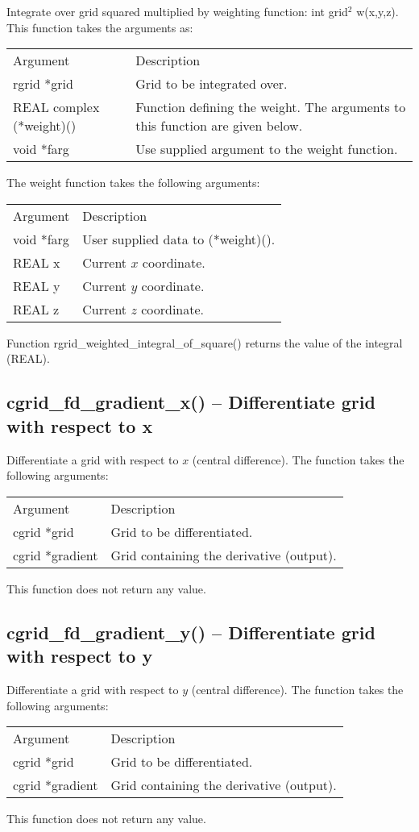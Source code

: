 \documentclass[12pt,letterpaper]{report}
\begin{document}
Integrate over grid squared multiplied by weighting function: int grid$^2$ w(x,y,z). This function takes the arguments as:
\begin{longtable}{p{} p{}}
Argument & Description\\
\cline{1-2}
rgrid *grid & Grid to be integrated over.\\
REAL complex (*weight)() & Function defining the weight. The arguments to this function are given below.\\
void *farg & Use supplied argument to the weight function.\\
\end{longtable}
\noindent
The weight function takes the following arguments:
\begin{longtable}{p{} p{}}
Argument & Description\\
\cline{1-2}
void *farg & User supplied data to (*weight)().\\
REAL x & Current $x$ coordinate.\\
REAL y & Current $y$ coordinate.\\
REAL z & Current $z$ coordinate.\\
\end{longtable}
\noindent
Function rgrid\_weighted\_integral\_of\_square() returns the value of the integral (REAL).

\subsection{cgrid\_fd\_gradient\_x() -- Differentiate grid with respect to x}

Differentiate a grid with respect to $x$ (central difference). The function takes the following arguments:
\begin{longtable}{p{} p{}}
Argument & Description\\
\cline{1-2}
cgrid *grid & Grid to be differentiated.\\
cgrid *gradient & Grid containing the derivative (output).\\
\end{longtable}
\noindent
This function does not return any value.

\subsection{cgrid\_fd\_gradient\_y() -- Differentiate grid with respect to y}

Differentiate a grid with respect to $y$ (central difference). The function takes the following arguments:
\begin{longtable}{p{} p{}}
Argument & Description\\
\cline{1-2}
cgrid *grid & Grid to be differentiated.\\
cgrid *gradient & Grid containing the derivative (output).\\
\end{longtable}
\noindent
This function does not return any value.
\end{document}
